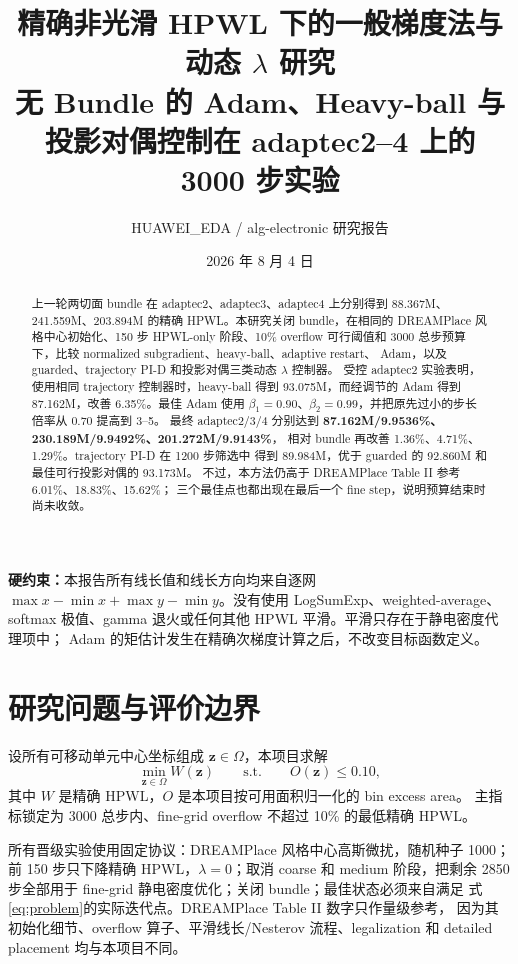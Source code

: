 \documentclass[UTF8,fontset=windows,a4paper,11pt]{ctexart}
\title{\textbf{精确非光滑 HPWL 下的一般梯度法与动态 $\lambda$ 研究}\\
\large 无 Bundle 的 Adam、Heavy-ball 与投影对偶控制在 adaptec2--4 上的 3000 步实验}
\author{HUAWEI\_EDA / alg-electronic 研究报告}
\date{2026 年 8 月 4 日}
\begin{document}
\maketitle

\begin{center}
\colorbox{soft}{\parbox{0.93\textwidth}{
\textbf{硬约束：}本报告所有线长值和线长方向均来自逐网
$\max x-\min x+\max y-\min y$。没有使用 LogSumExp、weighted-average、
softmax 极值、gamma 退火或任何其他 HPWL 平滑。平滑只存在于静电密度代理项中；
Adam 的矩估计发生在精确次梯度计算之后，不改变目标函数定义。
}}
\end{center}

\begin{abstract}
上一轮两切面 bundle 在 adaptec2、adaptec3、adaptec4 上分别得到
88.367M、241.559M、203.894M 的精确 HPWL。本研究关闭 bundle，在相同的
DREAMPlace 风格中心初始化、150 步 HPWL-only 阶段、10\% overflow 可行阈值和
3000 总步预算下，比较 normalized subgradient、heavy-ball、adaptive restart、
Adam，以及 guarded、trajectory PI-D 和投影对偶三类动态 $\lambda$ 控制器。
受控 adaptec2 实验表明，使用相同 trajectory 控制器时，heavy-ball 得到
93.075M，而经调节的 Adam 得到 87.162M，改善 6.35\%。最佳 Adam 使用
$\beta_1=0.90$、$\beta_2=0.99$，并把原先过小的步长倍率从 0.70 提高到 3--5。
最终 adaptec2/3/4 分别达到
\textbf{87.162M/9.9536\%、230.189M/9.9492\%、201.272M/9.9143\%}，
相对 bundle 再改善 1.36\%、4.71\%、1.29\%。trajectory PI-D 在 1200 步筛选中
得到 89.984M，优于 guarded 的 92.860M 和最佳可行投影对偶的 93.173M。
不过，本方法仍高于 DREAMPlace Table II 参考 6.01\%、18.83\%、15.62\%；
三个最佳点也都出现在最后一个 fine step，说明预算结束时尚未收敛。
\end{abstract}

\tableofcontents
\newpage

\section{研究问题与评价边界}

设所有可移动单元中心坐标组成 $\bm z\in\Omega$，本项目求解
\begin{equation}
 \min_{\bm z\in\Omega} W(\bm z)
 \qquad \text{s.t.}\qquad O(\bm z)\leq 0.10,
 \label{eq:problem}
\end{equation}
其中 $W$ 是精确 HPWL，$O$ 是本项目按可用面积归一化的 bin excess area。
主指标锁定为 3000 总步内、fine-grid overflow 不超过 10\% 的最低精确 HPWL。

所有晋级实验使用固定协议：DREAMPlace 风格中心高斯微扰，随机种子 1000；
前 150 步只下降精确 HPWL，$\lambda=0$；取消 coarse 和 medium 阶段，把剩余
2850 步全部用于 fine-grid 静电密度优化；关闭 bundle；最佳状态必须来自满足
式\eqref{eq:problem}的实际迭代点。DREAMPlace Table II 数字只作量级参考，
因为其初始化细节、overflow 算子、平滑线长/Nesterov 流程、legalization 和
detailed placement 均与本项目不同\cite{dreamplace}。
\end{document}
